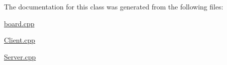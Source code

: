 The documentation for this class was generated from the following files\-:\begin{DoxyCompactItemize}
\item 
\hyperlink{board_8cpp}{board.\-cpp}\item 
\hyperlink{Client_8cpp}{Client.\-cpp}\item 
\hyperlink{Server_8cpp}{Server.\-cpp}\end{DoxyCompactItemize}
